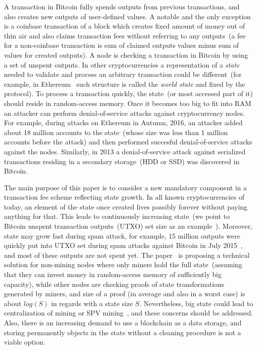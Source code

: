 \documentclass[]{llncs}   %
\begin{document}
A transaction in Bitcoin fully spends outputs from previous transactions, and
also creates new outputs of user-defined values. A notable and the only
exception is a coinbase transaction of a block which creates fixed amount of
money out of thin air and also claims transaction fees without referring to any
outputs~(a fee for a non-coinbase transaction is sum of claimed outputs values
minus sum of values for created outputs). A node is checking a transaction in
Bitcoin by using a set of unspent outputs. In other cryptocurrencies a
representation of a {\em state} needed to validate and process an arbitrary
transaction could be different~(for example, in Ethereum~\cite{ethyp} such
structure is called the {\em world state} and fixed by the protocol). To process
a transaction quickly, the state~(or most accessed part of it) should reside in
random-access memory. Once it becomes too big to fit into RAM an attacker can
perform denial-of-service attacks against cryptocurrency nodes. For example,
during attacks on Ethereum in Autumn, 2016, an attacker added about 18 million
accounts to the state~(whose size was less than 1 million accounts before the
attack) and then performed succesful denial-of-service attacks against the
nodes\cite{eth2016dos}. Similarly, in 2013 a denial-of-service attack against
serialized transactions residing in a secondary storage~(HDD or SSD) was
discovered in Bitcoin\cite{vasek2014empirical}.

The main purpose of this paper is to consider a new mandatory component in a
transaction fee scheme reflecting state growth. In all known cryptocurrencies of
today, an element of the state once created lives possibly forever without
paying anything for that. This leads to continuously increasing state~(we point
to Bitcoin unspent transaction outputs~(UTXO) set size as an
example~\cite{utxoChart}). Moreover, state may grow fast during spam attack, for
example, 15 million outputs were quickly put into UTXO set during spam attacks
against Bitcoin in July 2015~\cite{bitcoin2015flood}, and most of these outputs
are not spent yet. The paper~\cite{reyzin2016improving} is proposing a technical
solution for non-mining nodes where only miners hold the full state~(assuming
that they can invest money in  random-access memory of sufficiently big
capacity), while other nodes are checking proofs of state transformations
generated by miners, and size of a proof (in average and also in a worst case)
is about $log(S)$ in regards with a state size $S$. Nevertheless, big state
could lead to centralization of mining or SPV mining~\cite{spvMining}, and these
concerns should be addressed. Also, there is an increasing demand to use a
blockchain as a data storage, and storing permanently objects in the state
without a cleaning procedure is not a viable option.
\end{document}
